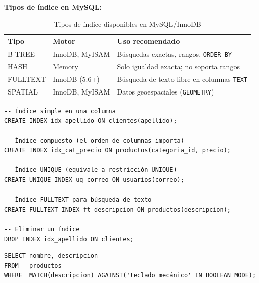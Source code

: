 \textbf{Tipos de índice en MySQL:}

\begin{table}[H]
  \centering
  \caption{Tipos de índice disponibles en MySQL/InnoDB}
  \renewcommand{\arraystretch}{1.3}
  \begin{tabularx}{\textwidth}{>{\ttfamily}l l X}
    \toprule
    \textbf{Tipo}   & \textbf{Motor}       & \textbf{Uso recomendado}                              \\
    \midrule
    B-TREE          & InnoDB, MyISAM       & Búsquedas exactas, rangos, \texttt{ORDER BY}          \\
    HASH            & Memory               & Solo igualdad exacta; no soporta rangos               \\
    FULLTEXT        & InnoDB (5.6+)        & Búsqueda de texto libre en columnas \texttt{TEXT}     \\
    SPATIAL         & InnoDB, MyISAM       & Datos geoespaciales (\texttt{GEOMETRY})               \\
    \bottomrule
  \end{tabularx}
\end{table}

\begin{lstlisting}[style=sql, caption={Creación y eliminación de índices}]
-- Índice simple en una columna
CREATE INDEX idx_apellido ON clientes(apellido);

-- Índice compuesto (el orden de columnas importa)
CREATE INDEX idx_cat_precio ON productos(categoria_id, precio);

-- Índice UNIQUE (equivale a restricción UNIQUE)
CREATE UNIQUE INDEX uq_correo ON usuarios(correo);

-- Índice FULLTEXT para búsqueda de texto
CREATE FULLTEXT INDEX ft_descripcion ON productos(descripcion);

-- Eliminar un índice
DROP INDEX idx_apellido ON clientes;
\end{lstlisting}

\begin{lstlisting}[style=sql, caption={Uso del índice FULLTEXT con MATCH ... AGAINST}]
SELECT nombre, descripcion
FROM   productos
WHERE  MATCH(descripcion) AGAINST('teclado mecánico' IN BOOLEAN MODE);
\end{lstlisting}

